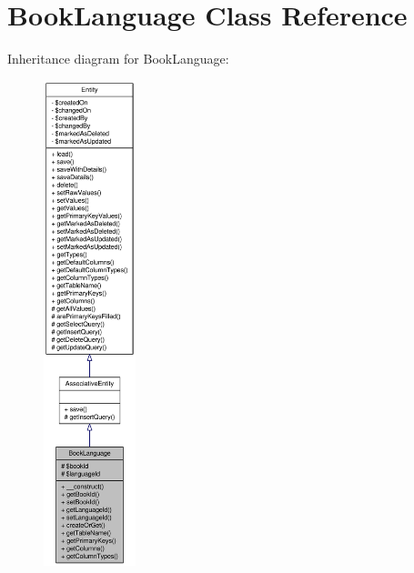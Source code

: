 \hypertarget{classBookLanguage}{
\section{BookLanguage Class Reference}
\label{classBookLanguage}
}


Inheritance diagram for BookLanguage:\nopagebreak
\begin{figure}[H]
\begin{center}
\leavevmode
\includegraphics[height=400pt]{classBookLanguage__inherit__graph}
\end{center}
\end{figure}


